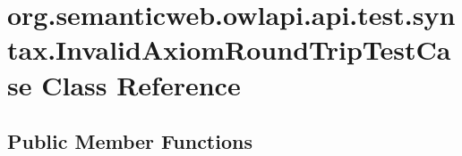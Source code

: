 \hypertarget{classorg_1_1semanticweb_1_1owlapi_1_1api_1_1test_1_1syntax_1_1_invalid_axiom_round_trip_test_case}{\section{org.\-semanticweb.\-owlapi.\-api.\-test.\-syntax.\-Invalid\-Axiom\-Round\-Trip\-Test\-Case Class Reference}
\label{classorg_1_1semanticweb_1_1owlapi_1_1api_1_1test_1_1syntax_1_1_invalid_axiom_round_trip_test_case}
}
\subsection*{Public Member Functions}
